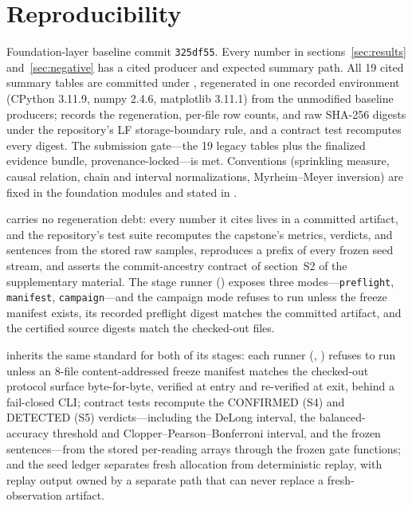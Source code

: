 \section{Reproducibility}\label{sec:repro}

Foundation-layer baseline commit \texttt{325df55}. Every number in
sections~\ref{sec:results} and~\ref{sec:negative} has a cited
 producer and expected summary path. All 19
cited summary tables are committed under ,
regenerated in one recorded environment (CPython 3.11.9, numpy 2.4.6,
matplotlib 3.11.1) from the unmodified baseline producers;
 records the regeneration, per-file row
counts, and raw SHA-256 digests under the repository's LF storage-boundary
rule, and a contract test recomputes every digest. The submission
gate---the 19 legacy tables plus the finalized 
evidence bundle, provenance-locked---is met. Conventions (sprinkling
measure, causal relation, chain and interval normalizations,
Myrheim--Meyer inversion) are fixed in the foundation modules and stated
in .

 carries no regeneration debt: every number it cites
lives in a committed artifact, and the repository's test suite recomputes
the capstone's metrics, verdicts, and sentences from the stored raw
samples, reproduces a prefix of every frozen seed stream, and asserts the
commit-ancestry contract of section~S2 of the supplementary material.
The stage
runner () exposes
three modes---\texttt{preflight}, \texttt{manifest},
\texttt{campaign}---and the campaign mode refuses to run unless the
freeze manifest exists, its recorded preflight digest matches the
committed artifact, and the certified source digests match the
checked-out files.

 inherits the same standard for both of its
stages: each runner
(,
)
refuses to run unless an 8-file content-addressed freeze manifest matches
the checked-out protocol surface byte-for-byte, verified at entry and
re-verified at exit, behind a fail-closed CLI; contract tests recompute
the CONFIRMED (S4) and DETECTED (S5) verdicts---including the DeLong
interval, the balanced-accuracy threshold and
Clopper--Pearson--Bonferroni interval, and the frozen sentences---from
the stored per-reading arrays through the frozen gate functions; and the
seed ledger separates fresh allocation from deterministic replay, with
replay output owned by a separate path that can never replace a
fresh-observation artifact.

